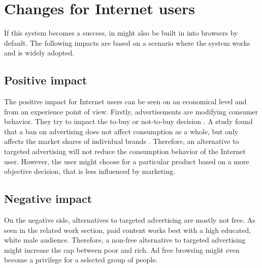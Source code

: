 \section{Changes for Internet users}
If this system becomes a success, in might also be built in into browsers by default. The following impacts are based on a scenario where the system works and is widely adopted. 

\subsection{Positive impact}
The positive impact for Internet users can be seen on an economical level and from an experience point of view. Firstly, advertisements are modifying consumer behavior. They try to impact the to-buy or not-to-buy decision \cite{johnson2007consumer}. A study found that a ban on advertising does not affect consumption as a whole, but only affects the market shares of individual brands \cite{advertisementsconsumption}. Therefore, an alternative to targeted advertising will not reduce the consumption behavior of the Internet user. However, the user might choose for a particular product based on a more objective decision, that is less influenced by marketing.

\subsection{Negative impact}
On the negative side, alternatives to targeted advertising are mostly not free. As seen in the related work section, paid content works best with a high educated, white male audience. Therefore, a non-free alternative to targeted advertising might increase the cap between poor and rich. Ad free browsing might even become a privilege for a selected group of people.
